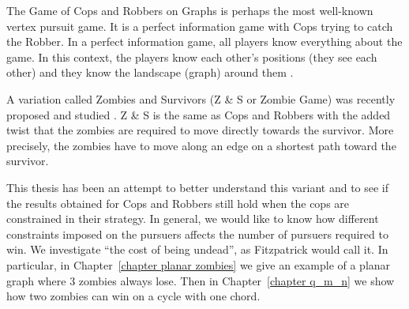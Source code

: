 The Game of Cops and Robbers on Graphs \cite{bonato2011game} is perhaps the most
well-known vertex pursuit game. It is a perfect information game with Cops trying
to catch the Robber. In a perfect information game, all players know everything about the game.
In this context, the players know each other's positions (they see each other) and they
know the landscape (graph) around them \cite{schaefer1978complexity}.

A variation called Zombies and Survivors (Z \& S or Zombie Game) was recently proposed and studied  \cite{fitzpatrick2016deterministic, fitzpatrick2018game}.
Z \& S is the same as Cops and Robbers with the added twist that the zombies are required to move directly towards the survivor. More precisely, the zombies have to move along an edge
on a shortest path toward the survivor.

This thesis has been an attempt to better understand this variant and
to see if the results obtained for Cops and Robbers still hold when the cops
are constrained in their strategy. In general, we would like to know how different constraints imposed on the pursuers affects the number of pursuers required to win. We investigate ``the cost of being undead'', as Fitzpatrick \cite{fitzpatrick2016deterministic} would call it.
In particular, in Chapter~\ref{chapter planar zombies}
we give an example of a planar graph where 3 zombies always lose.
Then in Chapter~\ref{chapter q_m_n} we show how two zombies can win on a cycle with one chord.

